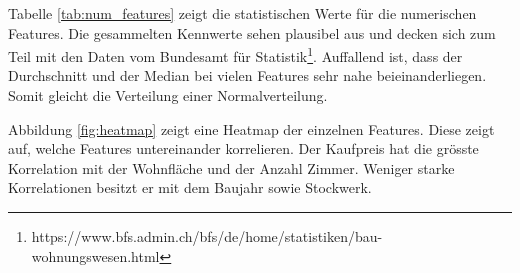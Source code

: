 Tabelle \ref{tab:num_features} zeigt die statistischen Werte für die numerischen Features. Die gesammelten Kennwerte sehen plausibel aus und decken sich zum Teil mit den Daten vom Bundesamt für Statistik\footnote{https://www.bfs.admin.ch/bfs/de/home/statistiken/bau-wohnungswesen.html}. Auffallend ist, dass der Durchschnitt und der Median bei vielen Features sehr nahe beieinanderliegen. Somit gleicht die Verteilung einer Normalverteilung.

\begin{table}[h]
\centering
{}
\caption{Statistische Werte der numerischen Features}
\label{tab:num_features}
\end{table}

Abbildung \ref{fig:heatmap} zeigt eine Heatmap der einzelnen Features. Diese zeigt auf, welche Features  untereinander korrelieren. Der Kaufpreis hat die grösste Korrelation mit der Wohnfläche und der Anzahl Zimmer. Weniger starke Korrelationen besitzt er mit dem Baujahr sowie Stockwerk.

